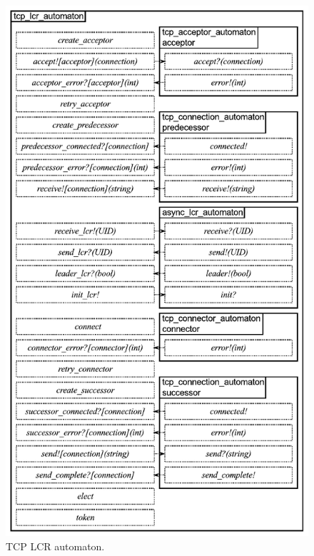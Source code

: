 \begin{figure}
\center
\includegraphics[width=\textwidth]{tcp_lcr_automaton}
\caption{TCP LCR automaton.}
\label{tcp_lcr_automaton}
\end{figure}

